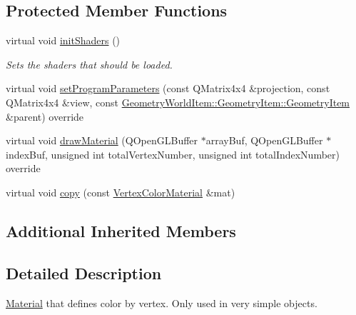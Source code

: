 \subsection*{Protected Member Functions}
\begin{DoxyCompactItemize}
\item 
\mbox{\label{class_geometry_engine_1_1_geometry_material_1_1_vertex_color_material_af390fb31e1017e64b7eeaaee36f29395}} 
virtual void \mbox{\hyperlink{class_geometry_engine_1_1_geometry_material_1_1_vertex_color_material_af390fb31e1017e64b7eeaaee36f29395}{init\+Shaders}} ()
\begin{DoxyCompactList}\small\item\em Sets the shaders that should be loaded. \end{DoxyCompactList}\item 
virtual void \mbox{\hyperlink{class_geometry_engine_1_1_geometry_material_1_1_vertex_color_material_a11bf01fb1d5ef41fb1a9cf4080c98b8c}{set\+Program\+Parameters}} (const Q\+Matrix4x4 \&projection, const Q\+Matrix4x4 \&view, const \mbox{\hyperlink{class_geometry_engine_1_1_geometry_world_item_1_1_geometry_item_1_1_geometry_item}{Geometry\+World\+Item\+::\+Geometry\+Item\+::\+Geometry\+Item}} \&parent) override
\item 
virtual void \mbox{\hyperlink{class_geometry_engine_1_1_geometry_material_1_1_vertex_color_material_af03191da84c84c45af91405f3cba3b5d}{draw\+Material}} (Q\+Open\+G\+L\+Buffer $\ast$array\+Buf, Q\+Open\+G\+L\+Buffer $\ast$index\+Buf, unsigned int total\+Vertex\+Number, unsigned int total\+Index\+Number) override
\item 
virtual void \mbox{\hyperlink{class_geometry_engine_1_1_geometry_material_1_1_vertex_color_material_ab1a686f175b2e4e0f581a8535450f112}{copy}} (const \mbox{\hyperlink{class_geometry_engine_1_1_geometry_material_1_1_vertex_color_material}{Vertex\+Color\+Material}} \&mat)
\end{DoxyCompactItemize}
\subsection*{Additional Inherited Members}


\subsection{Detailed Description}
\mbox{\hyperlink{class_geometry_engine_1_1_geometry_material_1_1_material}{Material}} that defines color by vertex. Only used in very simple objects. 

